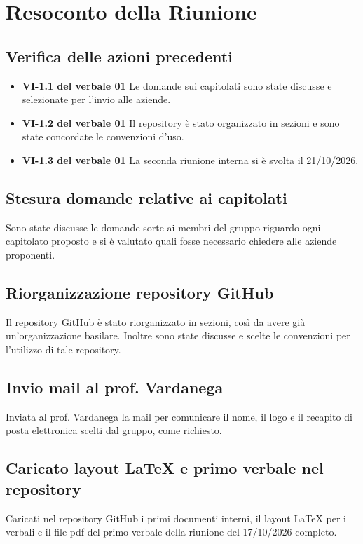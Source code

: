 \documentclass[a4paper, 11pt]{article}
\begin{document}
\newpage
\section{Resoconto della Riunione}

\subsection{Verifica delle azioni precedenti}
\begin{itemize}
    \item \textbf{VI-1.1 del verbale 01} Le domande sui capitolati sono state discusse e selezionate per l'invio alle aziende.
    \item \textbf{VI-1.2 del verbale 01} Il repository è stato organizzato in sezioni e sono state concordate le convenzioni d'uso.
    \item \textbf{VI-1.3 del verbale 01} La seconda riunione interna si è svolta il 21/10/2026.
\end{itemize}

\subsection{Stesura domande relative ai capitolati} 
Sono state discusse le domande sorte ai membri del gruppo riguardo ogni capitolato proposto e si è valutato quali fosse necessario chiedere alle aziende proponenti.


\subsection{Riorganizzazione repository GitHub}
Il repository GitHub è stato riorganizzato in sezioni, così da avere già un'organizzazione basilare. Inoltre sono state discusse e scelte le convenzioni per l'utilizzo di tale repository.

\subsection{Invio mail al prof. Vardanega}
Inviata al prof. Vardanega la mail per comunicare il nome, il logo e il recapito di posta elettronica scelti dal gruppo, come richiesto.

\subsection{Caricato layout LaTeX e primo verbale nel repository}
Caricati nel repository GitHub i primi documenti interni, il layout LaTeX per i verbali e il file pdf del primo verbale della riunione del 17/10/2026 completo.
\end{document}
